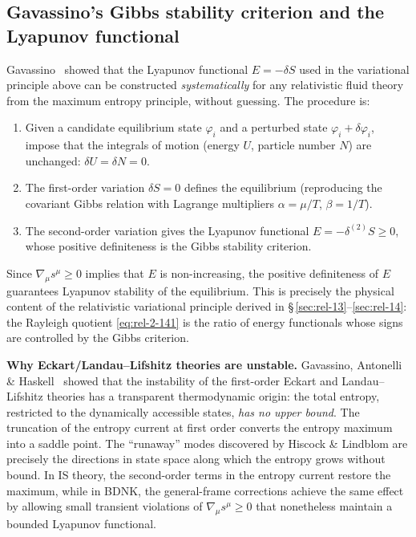 \subsection{Gavassino's Gibbs stability criterion and the Lyapunov
functional}\label{sec:rel-14-gibbs}

Gavassino~\citep{GavassinoGibbs2021} showed that the Lyapunov
functional $E = -\delta S$ used in the variational principle above can
be constructed \emph{systematically} for any relativistic fluid theory
from the maximum entropy principle, without guessing.  The procedure
is:
\begin{enumerate}
  \item Given a candidate equilibrium state $\varphi_{i}$ and a
    perturbed state $\varphi_{i} + \delta\varphi_{i}$, impose that
    the integrals of motion (energy $U$, particle number $N$) are
    unchanged: $\delta U = \delta N = 0$.
  \item The first-order variation $\delta S = 0$ defines the
    equilibrium (reproducing the covariant Gibbs relation with
    Lagrange multipliers $\alpha = \mu/T$, $\beta = 1/T$).
  \item The second-order variation gives the Lyapunov functional
    $E = -\delta^{(2)}S \ge 0$, whose positive definiteness is the
    Gibbs stability criterion.
\end{enumerate}
Since $\nabla_{\mu}s^{\mu} \ge 0$ implies that $E$ is non-increasing,
the positive definiteness of $E$ guarantees Lyapunov stability of the
equilibrium.  This is precisely the physical content of the
relativistic variational principle derived in
\S\,\ref{sec:rel-13}--\ref{sec:rel-14}: the Rayleigh quotient
\eqref{eq:rel-2-141} is the ratio of energy functionals whose signs
are controlled by the Gibbs criterion.

\begin{relcorrection}
\textbf{Why Eckart/Landau--Lifshitz theories are unstable.}
Gavassino, Antonelli \& Haskell~\citep{GavassinoLyapunov2020} showed
that the instability of the first-order Eckart and Landau--Lifshitz
theories has a transparent thermodynamic origin: the total entropy,
restricted to the dynamically accessible states, \emph{has no upper
bound}.  The truncation of the entropy current at first order converts
the entropy maximum into a saddle point.  The ``runaway'' modes
discovered by Hiscock \& Lindblom are precisely the directions in
state space along which the entropy grows without bound.  In IS
theory, the second-order terms in the entropy current restore the
maximum, while in BDNK, the general-frame corrections achieve the
same effect by allowing small transient violations of $\nabla_{\mu}
s^{\mu} \ge 0$ that nonetheless maintain a bounded Lyapunov
functional.
\end{relcorrection}

